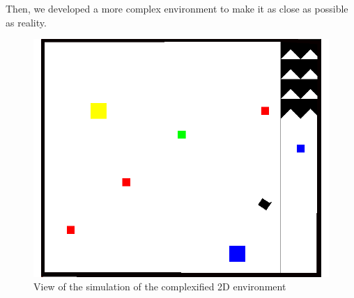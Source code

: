 \documentclass[conference]{IEEEtran}
\begin{document}
Then, we developed a more complex environment to make it as close as possible as reality.\\

\begin{figure}
  \includegraphics[scale = 0.3]{images/2Dcomplex.png}
  \caption{View of the simulation of the complexified 2D environment}
  \label{fig:my-figure}
\end{figure}
\end{document}
